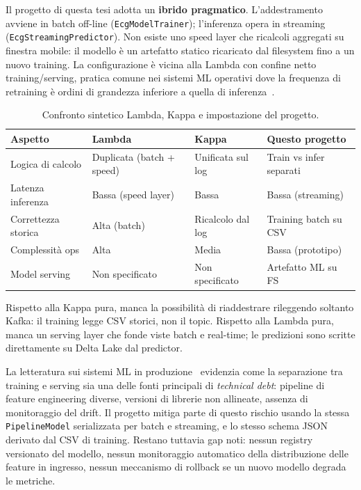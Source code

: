 Il progetto di questa tesi adotta un \textbf{ibrido pragmatico}.
L'addestramento avviene in batch off-line (\texttt{EcgModelTrainer}); l'inferenza opera in streaming (\texttt{EcgStreamingPredictor}).
Non esiste uno speed layer che ricalcoli aggregati su finestra mobile: il modello è un artefatto statico ricaricato dal filesystem fino a un nuovo training.
La configurazione è vicina alla Lambda con confine netto training/serving, pratica comune nei sistemi ML operativi dove la frequenza di retraining è ordini di grandezza inferiore a quella di inferenza~\cite{sculley2015hidden}.

\begin{table}[H]
  \centering
  \caption{Confronto sintetico Lambda, Kappa e impostazione del progetto.}
  \label{tab:lambda-kappa-confronto}
  \footnotesize
  \begin{tabular}{@{}p{2.4cm}p{2.9cm}p{2.9cm}p{3.3cm}@{}}
    \toprule
    \textbf{Aspetto} & \textbf{Lambda} & \textbf{Kappa} & \textbf{Questo progetto} \\
    \midrule
    Logica di calcolo & Duplicata (batch + speed) & Unificata sul log & Train vs infer separati \\
    Latenza inferenza & Bassa (speed layer) & Bassa & Bassa (streaming) \\
    Correttezza storica & Alta (batch) & Ricalcolo dal log & Training batch su CSV \\
    Complessità ops & Alta & Media & Bassa (prototipo) \\
    Model serving & Non specificato & Non specificato & Artefatto ML su FS \\
    \bottomrule
  \end{tabular}
\end{table}

Rispetto alla Kappa pura, manca la possibilità di riaddestrare rileggendo soltanto Kafka: il training legge CSV storici, non il topic.
Rispetto alla Lambda pura, manca un serving layer che fonde viste batch e real-time; le predizioni sono scritte direttamente su Delta Lake dal predictor.

La letteratura sui sistemi ML in produzione~\cite{sculley2015hidden} evidenzia come la separazione tra training e serving sia una delle fonti principali di \emph{technical debt}: pipeline di feature engineering diverse, versioni di librerie non allineate, assenza di monitoraggio del drift.
Il progetto mitiga parte di questo rischio usando la stessa \texttt{PipelineModel} serializzata per batch e streaming, e lo stesso schema JSON derivato dal CSV di training.
Restano tuttavia gap noti: nessun registry versionato del modello, nessun monitoraggio automatico della distribuzione delle feature in ingresso, nessun meccanismo di rollback se un nuovo modello degrada le metriche.

